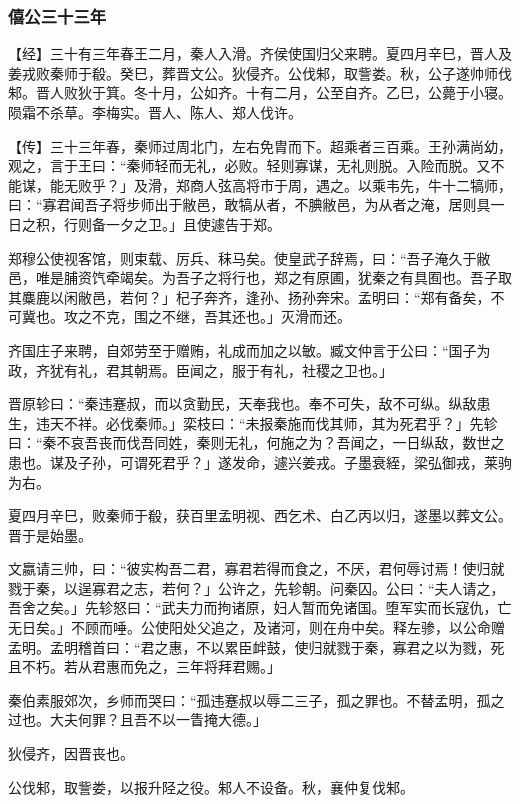 \documentclass[]{article}
\begin{document}
\hypertarget{header-n1027}{%
\subsubsection{僖公三十三年}\label{header-n1027}}

【经】三十有三年春王二月，秦人入滑。齐侯使国归父来聘。夏四月辛巳，晋人及姜戎败秦师于殽。癸巳，葬晋文公。狄侵齐。公伐邾，取訾娄。秋，公子遂帅师伐邾。晋人败狄于箕。冬十月，公如齐。十有二月，公至自齐。乙巳，公薨于小寝。陨霜不杀草。李梅实。晋人、陈人、郑人伐许。

【传】三十三年春，秦师过周北门，左右免胄而下。超乘者三百乘。王孙满尚幼，观之，言于王曰：``秦师轻而无礼，必败。轻则寡谋，无礼则脱。入险而脱。又不能谋，能无败乎？」及滑，郑商人弦高将市于周，遇之。以乘韦先，牛十二犒师，曰：``寡君闻吾子将步师出于敝邑，敢犒从者，不腆敝邑，为从者之淹，居则具一日之积，行则备一夕之卫。」且使遽告于郑。

郑穆公使视客馆，则束载、厉兵、秣马矣。使皇武子辞焉，曰：``吾子淹久于敝邑，唯是脯资饩牵竭矣。为吾子之将行也，郑之有原圃，犹秦之有具囿也。吾子取其麋鹿以闲敝邑，若何？」杞子奔齐，逢孙、扬孙奔宋。孟明曰：``郑有备矣，不可冀也。攻之不克，围之不继，吾其还也。」灭滑而还。

齐国庄子来聘，自郊劳至于赠贿，礼成而加之以敏。臧文仲言于公曰：``国子为政，齐犹有礼，君其朝焉。臣闻之，服于有礼，社稷之卫也。」

晋原轸曰：``秦违蹇叔，而以贪勤民，天奉我也。奉不可失，敌不可纵。纵敌患生，违天不祥。必伐秦师。」栾枝曰：``未报秦施而伐其师，其为死君乎？」先轸曰：``秦不哀吾丧而伐吾同姓，秦则无礼，何施之为？吾闻之，一日纵敌，数世之患也。谋及子孙，可谓死君乎？」遂发命，遽兴姜戎。子墨衰絰，梁弘御戎，莱驹为右。

夏四月辛巳，败秦师于殽，获百里孟明视、西乞术、白乙丙以归，遂墨以葬文公。晋于是始墨。

文嬴请三帅，曰：``彼实构吾二君，寡君若得而食之，不厌，君何辱讨焉！使归就戮于秦，以逞寡君之志，若何？」公许之，先轸朝。问秦囚。公曰：``夫人请之，吾舍之矣。」先轸怒曰：``武夫力而拘诸原，妇人暂而免诸国。堕军实而长寇仇，亡无日矣。」不顾而唾。公使阳处父追之，及诸河，则在舟中矣。释左骖，以公命赠孟明。孟明稽首曰：``君之惠，不以累臣衅鼓，使归就戮于秦，寡君之以为戮，死且不朽。若从君惠而免之，三年将拜君赐。」

秦伯素服郊次，乡师而哭曰：``孤违蹇叔以辱二三子，孤之罪也。不替孟明，孤之过也。大夫何罪？且吾不以一眚掩大德。」

狄侵齐，因晋丧也。

公伐邾，取訾娄，以报升陉之役。邾人不设备。秋，襄仲复伐邾。
\end{document}

